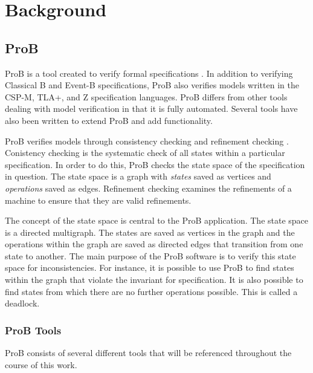\section{Background}

\subsection{ProB}

ProB is a tool created to verify formal specifications \cite{LeBu08_225}. In addition to verifying Classical B and Event-B specifications, ProB also verifies models written in the CSP-M, TLA+, and Z specification languages. ProB differs from other tools dealing with model verification in that it is fully automated. Several tools have also been written to extend ProB and add functionality.

ProB verifies models through consistency checking \cite{LeBu03_32} and refinement checking \cite{LeBu05_5}. Conistency checking is the systematic check of all states within a particular specification. In order to do this, ProB checks the state space of the specification in question. The state space is a graph with \emph{states} saved as vertices and \emph{operations} saved as edges. Refinement checking examines the refinements of a machine to ensure that they are valid refinements.

The concept of the state space is central to the ProB application. The state space is a directed multigraph. The states are saved as vertices in the graph and the operations within the graph are saved as directed edges that transition from one state to another. The main purpose of the ProB software is to verify this state space for inconsistencies. For instance, it is possible to use ProB to find states within the graph that violate the invariant for specification. It is also possible to find states from which there are no further operations possible. This is called a deadlock.


\subsubsection{ProB Tools}

ProB consists of several different tools that will be referenced throughout the course of this work. 

